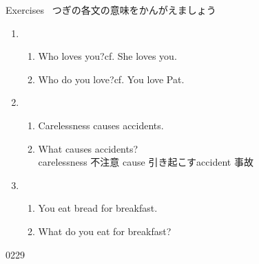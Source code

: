 \documentclass[aspectratio=169,xcolor={dvipsnames,table}]{beamer}
\begin{document}
\begin{frame}[plain]{Exercises}
\textdbend\,\,\,つぎの各文の意味をかんがえましょう

\begin{enumerate}
 \item<1-> \begin{enumerate}
		  \item Who loves you?\hfill{}cf. She loves you.
		  \item Who do you love?\hfill{}cf. You love Pat. 
		 \end{enumerate}
 \item<2-> \begin{enumerate}
	\item Carelessness causes accidents.
	\item What causes accidents?\\
\hfill\hfill{\scriptsize carelessness  不注意\hspace{10pt} cause  引き起こす\hspace{10pt}accident  事故}
       \end{enumerate}
 \item<3-> \begin{enumerate}
	\item You eat bread for breakfast.
	\item What do you eat for breakfast?
       \end{enumerate}

\end{enumerate}
\hfill{\tiny 0229}\,{\scriptsize {}}

\end{frame}
\end{document}
